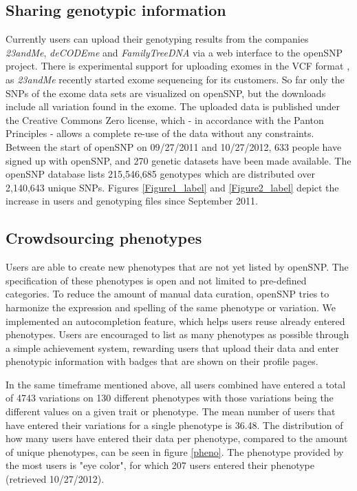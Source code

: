 \documentclass[10pt]{article}
\begin{document}
\subsection*{Sharing genotypic information}
Currently users can upload their genotyping results from the companies \textit{23andMe}, \textit{deCODEme }and \textit{FamilyTreeDNA} via a web interface to the openSNP 
project. There is experimental support for uploading exomes in the VCF format \cite{Danecek01082011}, as \textit{23andMe} recently started exome sequencing for its customers. So far only the SNPs of the exome data sets are visualized on openSNP, but the downloads include all variation found in the exome.
The uploaded data is published under the Creative Commons Zero license, 
which - in accordance with the Panton Principles \cite{10.1371/journal.pbio.1001195} - 
allows a complete re-use of the data without any constraints.
Between the start of openSNP on 09/27/2011 and 10/27/2012, 633 people have signed 
up with openSNP, and 270 genetic datasets have been made available. The openSNP 
database lists 215,546,685 genotypes which are distributed over 2,140,643 unique SNPs.
Figures \ref{Figure1_label} and \ref{Figure2_label} depict the increase in users and genotyping files since September 2011.


\subsection*{Crowdsourcing phenotypes}
Users are able to create new phenotypes that are not yet 
listed by openSNP. 
The specification of these phenotypes is open and not limited 
to pre-defined categories. To reduce the amount of manual data curation, openSNP tries to harmonize 
the expression and spelling of the same phenotype or variation. We implemented an 
autocompletion feature, which helps users reuse already entered phenotypes.
Users are encouraged to list as many phenotypes as possible through a simple 
achievement system, rewarding users that upload their data and enter phenotypic 
information with badges that are shown on their profile pages.

In the same timeframe mentioned above, all users combined have 
entered a total of 4743 variations on 130 different phenotypes with those variations being 
the different values on a given trait or phenotype. The mean number of users that have entered their variations for a single phenotype 
is 36.48. The distribution of how many users have 
entered their data per phenotype, compared to the amount of unique phenotypes, can be seen in figure \ref{pheno}. The phenotype provided by the most users is "eye color", for which 207 users entered their phenotype (retrieved 10/27/2012). 
\end{document}
